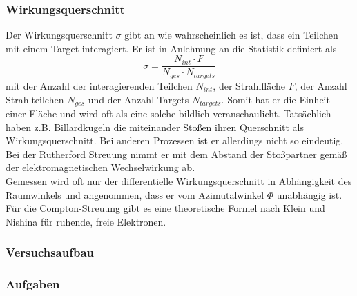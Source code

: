 \subsubsection{Wirkungsquerschnitt}
Der Wirkungsquerschnitt $\sigma$ gibt an wie wahrscheinlich es ist, dass ein Teilchen mit einem Target interagiert. Er ist in Anlehnung an die Statistik definiert als
$$\sigma = \frac{N_{int} \cdot F}{N_{ges} \cdot N_{targets}} $$
mit der Anzahl der interagierenden Teilchen $N_{int}$, der Strahlfläche $F$, der Anzahl Strahlteilchen $N_{ges}$ und der Anzahl Targets $N_{targets}$. Somit hat er die Einheit einer Fläche und wird oft als eine solche bildlich veranschaulicht. Tatsächlich haben z.B. Billardkugeln die miteinander Stoßen ihren Querschnitt als Wirkungsquerschnitt. Bei anderen Prozessen ist er allerdings nicht so eindeutig. Bei der Rutherford Streuung nimmt er mit dem Abstand der Stoßpartner gemäß der elektromagnetischen Wechselwirkung ab. \\
Gemessen wird oft nur der differentielle Wirkungsquerschnitt in Abhängigkeit des Raumwinkels und angenommen, dass er vom Azimutalwinkel $\Phi$ unabhängig ist. \\
Für die Compton-Streuung gibt es eine theoretische Formel nach Klein und Nishina für ruhende, freie Elektronen.

\subsubsection{Versuchsaufbau}

\subsubsection{Aufgaben}
